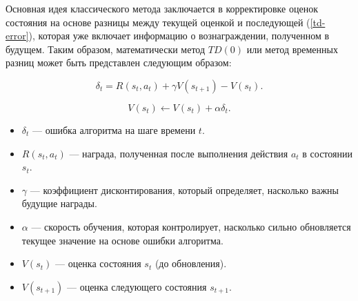 Основная идея классического метода заключается в корректировке оценок состояния на основе разницы между текущей оценкой и последующей (\ref{td-error}), которая уже включает информацию о вознаграждении, полученном в будущем. Таким образом, математически метод $TD(0)$ или метод временных разниц может быть представлен следующим образом:

\pagebreak

\begin{equation}\label{td-error}
    \delta_t = R(s_t, a_t) + \gamma V(s_{t+1}) - V(s_t).
\end{equation}

\begin{equation}\label{td-base}
    V(s_t) \leftarrow V(s_t) + \alpha \delta_t.
\end{equation}

\begin{itemize}
    \item $\delta_t$ --- ошибка алгоритма на шаге времени $t$.
    \item $R(s_t, a_t)$ --- награда, полученная после выполнения действия $a_t$ в состоянии $s_t$.
    \item $\gamma$ --- коэффициент дисконтирования, который определяет, насколько важны будущие награды.
    \item $\alpha$ — скорость обучения, которая контролирует, насколько сильно обновляется текущее значение на основе ошибки алгоритма.
    \item $V(s_t)$ --- оценка состояния $s_t$ (до обновления).
    \item $V(s_{t+1})$ --- оценка следующего состояния $s_{t+1}$.
\end{itemize}

